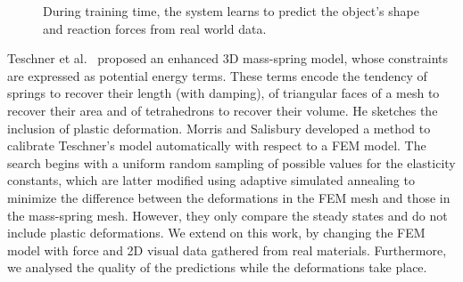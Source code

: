 \documentclass[journal]{IEEEtran}
\begin{document}
\begin{figure}[!t]
\centering
\setlength\fboxsep{0pt}    %
\setlength\fboxrule{0.5pt} %
\caption{During training time, the system learns to predict the object's shape and reaction forces from real world data.}
\label{fig:system}
\end{figure}


Teschner et al.\ \cite{Teschner2004} proposed an enhanced 3D mass-spring model, whose constraints are expressed as potential energy terms.  These terms encode the tendency of springs to recover their length (with damping), of triangular faces of a mesh to recover their area and of tetrahedrons to recover their volume.  He sketches the inclusion of plastic deformation.  Morris and Salisbury \cite{Morris2008} developed a method to calibrate Teschner's model automatically with respect to a FEM model.  The  search begins with a uniform random sampling of possible values for the elasticity constants, which are latter modified using adaptive simulated annealing to minimize the difference between the deformations in the FEM mesh and those in the mass-spring mesh.  However, they only compare the steady states and do not include plastic deformations.  We extend on this work, by changing the FEM model with force and 2D visual data gathered from real materials.  Furthermore, we analysed the quality of the predictions while the deformations take place.
\end{document}
